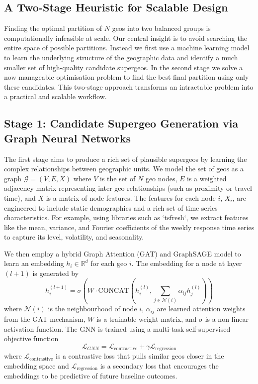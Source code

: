 \documentclass[final,3p,fleqn, 10pt]{elsarticle}
\begin{document}
    \subsection{A Two-Stage Heuristic for Scalable Design}
    Finding the optimal partition of $N$ geos into two balanced groups is computationally infeasible at scale. Our central insight is to avoid searching the entire space of possible partitions. Instead we first use a machine learning model to learn the underlying structure of the geographic data and identify a much smaller set of high-quality candidate supergeos. In the second stage we solve a now manageable optimisation problem to find the best final partition using only these candidates. This two-stage approach transforms an intractable problem into a practical and scalable workflow.

    \subsection{Stage 1: Candidate Supergeo Generation via Graph Neural Networks}
    The first stage aims to produce a rich set of plausible supergeos by learning the complex relationships between geographic units. We model the set of geos as a graph $\mathcal{G} = (V, E, X)$ where $V$ is the set of $N$ geo nodes, $E$ is a weighted adjacency matrix representing inter-geo relationships (such as proximity or travel time), and $X$ is a matrix of node features. The features for each node $i$, $X_i$, are engineered to include static demographics and a rich set of time series characteristics. For example, using libraries such as `tsfresh`, we extract features like the mean, variance, and Fourier coefficients of the weekly response time series to capture its level, volatility, and seasonality.

    We then employ a hybrid Graph Attention (GAT) and GraphSAGE model to learn an embedding $h_i \in \mathbb{R}^d$ for each geo $i$. The embedding for a node at layer $(l+1)$ is generated by
    $$ h_i^{(l+1)} = \sigma\left(W \cdot \text{CONCAT}\left(h_i^{(l)}, \sum_{j \in \mathcal{N}(i)} \alpha_{ij} h_j^{(l)}\right)\right) $$
    where $\mathcal{N}(i)$ is the neighbourhood of node $i$, $\alpha_{ij}$ are learned attention weights from the GAT mechanism, $W$ is a trainable weight matrix, and $\sigma$ is a non-linear activation function. The GNN is trained using a multi-task self-supervised objective function
    $$ \mathcal{L}_{GNN} = \mathcal{L}_{\text{contrastive}} + \gamma \mathcal{L}_{\text{regression}} $$
    where $\mathcal{L}_{\text{contrastive}}$ is a contrastive loss that pulls similar geos closer in the embedding space and $\mathcal{L}_{\text{regression}}$ is a secondary loss that encourages the embeddings to be predictive of future baseline outcomes.
\end{document}
